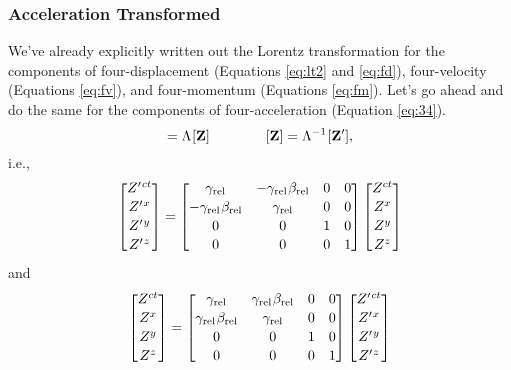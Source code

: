 \documentclass[12pt]{article}
\renewcommand{\vv}[1]{\mathbf{#1}}
\begin{document}
\subsubsection{Acceleration Transformed}

We've already explicitly written out the Lorentz transformation for the components of four-displacement (Equations \ref{eq:lt2} and \ref{eq:fd}), four-velocity (Equations \ref{eq:fv}), and four-momentum (Equations \ref{eq:fm}). Let's go ahead and do the same for the components of four-acceleration (Equation \ref{eq:34}).
\begin{equation*}
[\vv Z^\prime] = \Lambda \mkern1mu [\vv Z] \qquad \qquad [\vv Z] = \Lambda^{-1} \mkern1mu [\vv Z^\prime] ,
\end{equation*}
i.e.,
\begin{equation*}
\begin{bmatrix}
Z^{\prime \mkern1.5mu ct} \\[.15 em]
Z^{\prime \mkern1.5mu x} \\[.15 em]
Z^{\prime \mkern1.5mu y} \\[.15 em]
Z^{\prime \mkern1.5mu z}
\end{bmatrix}
=
\begin{bmatrix}
\gamma_{\textrm{rel}} & -\gamma_{\textrm{rel}} \mkern1mu \beta_{\textrm{rel}} & 0 & 0 \\[.15 em]
- \gamma_{\textrm{rel}} \mkern1mu \beta_{\textrm{rel}} & \gamma_{\textrm{rel}} & 0 & 0 \\[.15 em]
0 & 0 & 1 & 0 \\[.15 em]
0 & 0 & 0 & 1
\end{bmatrix}
\begin{bmatrix}
Z^{ct} \\[.15 em]
Z^{x} \\[.15 em]
Z^{y} \\[.15 em]
Z^{z}
\end{bmatrix}
\end{equation*}
and
\begin{equation*}
\begin{bmatrix}
Z^{ct} \\[.15 em]
Z^{x} \\[.15 em]
Z^{y} \\[.15 em]
Z^{z}
\end{bmatrix}
=
\begin{bmatrix}
\gamma_{\textrm{rel}} & \gamma_{\textrm{rel}} \mkern1mu \beta_{\textrm{rel}} & 0 & 0 \\[.15 em]
\gamma_{\textrm{rel}} \mkern1mu \beta_{\textrm{rel}} & \gamma_{\textrm{rel}} & 0 & 0 \\[.15 em]
0 & 0 & 1 & 0 \\[.15 em]
0 & 0 & 0 & 1
\end{bmatrix}
\begin{bmatrix}
Z^{\prime \mkern1.5mu ct} \\[.15 em]
Z^{\prime \mkern1.5mu x} \\[.15 em]
Z^{\prime \mkern1.5mu y} \\[.15 em]
Z^{\prime \mkern1.5mu z}
\end{bmatrix}
\end{equation*}
\end{document}
